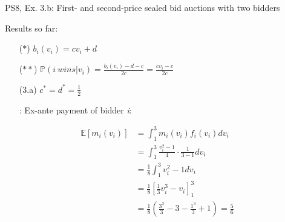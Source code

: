 \begin{frame}{PS8, Ex. 3.b: First- and second-price sealed bid auctions with two bidders}
\begin{multicols}{2}
\begin{enumerate}
      \end{enumerate}
      \vspace{-6pt}
      Results so far:
      \vspace{-6pt}
      \begin{itemize}
        \item[($*$)]  $b_i(v_i) = cv_i+d$
        \item[($**$)] $\mathbb{P}(i\ wins|v_i)=\frac{b_i(v_i)-d-c}{2c}=\frac{cv_i-c}{2c}$
        \item[(3.a)]    $c^*=d^*=\frac{1}{2}$
        \item[\nth{2}:] Ex-ante payment of bidder \textit{i}:
      \end{itemize}
      \vspace{-12pt}
      \begin{align*}
        \mathbb{E}[m_i(v_i)]&=\textstyle\int_1^3m_i(v_i)f_i(v_i)dv_i\\
                            &=\textstyle\int_1^3\frac{v_i^2-1}{4}\cdot\frac{1}{3-1}dv_i\\
                            &=\frac{1}{8}\textstyle\int_1^3v_i^2-1dv_i\\
                            &=\frac{1}{8}\left[\frac{1}{3}v_i^3-v_i\right]_1^3\\
                            &=\frac{1}{8}\left(\frac{3^3}{3}-3-\frac{1^3}{3}+1\right)=\frac{5}{6}
      \end{align*}
      \vfill\null
    \end{multicols}
\end{frame}


